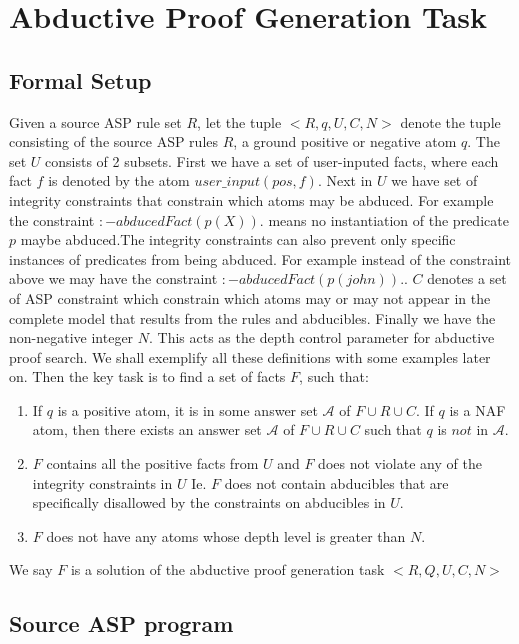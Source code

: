 \documentclass{article}
\begin{document}
\section{Abductive Proof Generation Task}\label{sec:abductive_proof}
\subsection{Formal Setup}
Given a source ASP rule set $R$, let the tuple $<R,q,U,C,N>$ denote the tuple consisting of the source ASP rules $R$, a ground positive or negative atom $q$. The set $U$ consists of 2 subsets. First we have a set of user-inputed facts, where each fact $f$ is denoted by the atom $user\_input(pos,f)$. Next in $U$ we have set of integrity constraints that constrain which atoms may be abduced. For example the constraint $:-abducedFact(p(X)).$ means no instantiation of the predicate $p$ maybe abduced.The integrity constraints can also prevent only specific instances of predicates from being abduced. For example instead of the constraint above we may have the constraint $:-abducedFact(p(john)).$.  $C$ denotes a set of ASP constraint which constrain which atoms may or may not appear in the complete model that results from the rules and abducibles. Finally we have the non-negative integer $N$. This acts as the depth control parameter for abductive proof search. We shall exemplify all these definitions with some examples later on. Then the key task is to find a set of facts $F$, such that:

\begin{enumerate}
    \item If $q$ is a positive atom, it is in some answer set $\mathcal{A}$ of $F\cup R\cup C$. If $q$ is a NAF atom, then there exists an answer set $\mathcal{A}$ of $F\cup R\cup C$ such that $q$ is $not$ in $\mathcal{A}$.
    \item $F$ contains all the positive facts from $U$ and $F$ does not violate any of the integrity constraints in $U$ Ie. $F$ does not contain abducibles that are specifically disallowed by the constraints on abducibles in $U$.
    \item $F$ does not have any atoms whose depth level is greater than $N$.
\end{enumerate}
We say $F$ is a solution of the abductive proof generation task $<R,Q,U,C,N>$

\subsection{Source ASP program}
\end{document}
